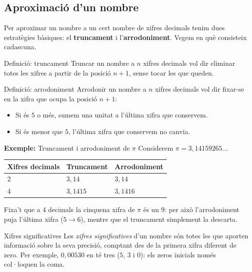 \subsection{Aproximació d'un nombre}

Per aproximar un nombre a un cert nombre de xifres decimals tenim dues estratègies bàsiques: el \textbf{truncament} i l'\textbf{arrodoniment}. Vegem en què consisteix cadascuna.

\begin{definicio}{Definició: truncament}
Truncar un nombre a $n$ xifres decimals vol dir eliminar totes les xifres a partir de la posició $n+1$, sense tocar les que queden.
\end{definicio}

\begin{definicio}{Definició: arrodoniment}
Arrodonir un nombre a $n$ xifres decimals vol dir fixar-se en la xifra que ocupa la posició $n+1$:

\begin{itemize}
\item Si és $5$ o més, sumem una unitat a l'última xifra que conservem.
\item Si és menor que $5$, l'última xifra que conservem no canvia.
\end{itemize}
\end{definicio}

\begin{exemple}{\textbf{Exemple:} Truncament i arrodoniment de $\pi$}
Considerem $\pi = 3{,}14159265\ldots$

\begin{center}
\begin{tabular}{lll}
\toprule
\textbf{Xifres decimals} & \textbf{Truncament} & \textbf{Arrodoniment} \\
\midrule
2 & $3{,}14$ & $3{,}14$ \\
4 & $3{,}1415$ & $3{,}1416$ \\
\bottomrule
\end{tabular}
\end{center}

Fixa't que a 4 decimals la cinquena xifra de $\pi$ és un $9$: per això l'arrodoniment puja l'última xifra ($5 \to 6$), mentre que el truncament simplement la descarta.
\end{exemple}

\begin{nota}{Xifres significatives}
Les \emph{xifres significatives} d'un nombre són totes les que aporten informació sobre la seva precisió, comptant des de la primera xifra diferent de zero. Per exemple, $0{,}00530$ en té tres ($5$, $3$ i $0$): els zeros inicials només col·loquen la coma.
\end{nota}

